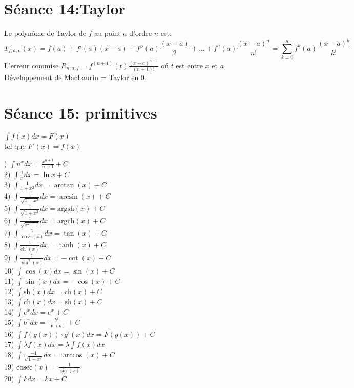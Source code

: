 \documentclass[12pt]{article}
\newcommand{\argsh}{\mathrm{argsh}} %
\newcommand{\argch}{\mathrm{argch}} %
\newcommand{\ch}{\mathrm{ch}}
\newcommand{\sh}{\mathrm{sh}}
\begin{document}
\section*{S\'eance 14:Taylor}
Le polyn\^ome de Taylor de $f$ au point $a$ d'ordre $n$ est: \[T_{f, a, n}(x) = f(a) + f'(a)(x-a)+f''(a)\frac{(x-a)}{2}+...+f^{\underset{-}n}(a)\frac{(x-a)^{n}}{n!} = \sum_{k=0}^{n} f^{k}(a)\frac{(x-a)^{k}}{k!}\]
L'erreur commise $R_{n, a, f} = f^{(n+1)}(t)\frac{(x-a)^{n+1}}{(n+1)!}$ o\'u $t$ est entre $x$ et $a$ \\ \newline
D\'eveloppement de MacLaurin = Taylor en $0$.
\newpage

\section*{S\'eance 15: primitives}

$\int{f(x) dx} = F(x)$ \\
\indent tel que $F'(x) = f(x)$
\begin{multicols}{2}
) $\int{n^{x} dx} = \frac{x^{n+1}}{n+1} + C$ \\
2) $\int{\frac{1}{x} dx} = \ln{x} + C$ \\
3) $\int{\frac{1}{1+x^{2}} dx} = \arctan{(x)} + C$ \\
4) $\int{\frac{1}{\sqrt{1-x^{2}}} dx} = \arcsin{(x)} + C$ \\
5) $\int{\frac{1}{\sqrt{1+x^{2}}} dx} = \argsh(x) + C$ \\
6) $\int{\frac{1}{\sqrt{x^{2}-1}} dx} = \argch(x) + C$ \\
7) $\int{\frac{1}{\cos^{2}(x)} dx} = \tan(x) + C$ \\
8) $\int{\frac{1}{\ch^{2}(x)} dx} = \tanh(x) + C$ \\
9) $\int{\frac{1}{\sin^{2}(x)} dx} = -\cot(x) + C$ \\
10) $\int{\cos(x) dx} = \sin(x) + C$ \\
11) $\int{\sin(x) dx} = -\cos(x) + C$ \\
12) $\int{\sh(x) dx} = \ch(x) + C$ \\
13) $\int{\ch(x) dx} = \sh(x) + C$ \\
14) $\int{e^{x} dx} = e^{x} + C$ \\
15) $\int{b^{x} dx} = \frac{b^{x}}{\ln(b)} + C$ \\
16) $\int{f(g(x))\cdot g'(x) dx} = F(g(x)) + C$ \\
17) $\int{\lambda f(x) dx} = \lambda \int{f(x) dx}$ \\
18) $\int{\frac{-1}{\sqrt{1-x^{2}}} dx} = \arccos(x) + C$ \\
19) $\mathrm{cosec}(x) = \frac{1}{\sin(x)}$ \\
20) $\int{k dx} = kx + C$
\end{multicols}
\end{document}
